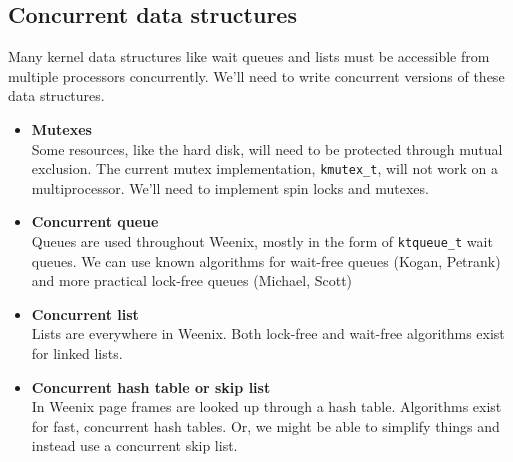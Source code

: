 \documentclass{article}
\begin{document}
\subsection{Concurrent data structures}

Many kernel data structures like wait queues and lists must be accessible from multiple
processors concurrently. We'll need to write concurrent versions of these data structures.

\begin{itemize}
    \item \textbf{Mutexes}\\
    Some resources, like the hard disk, will need to be protected through mutual exclusion. The current mutex
    implementation, {\tt{kmutex\_t}}, will not work on a multiprocessor. We'll need to implement
    spin locks and mutexes.
    \item \textbf{Concurrent queue}\\
    Queues are used throughout Weenix, mostly in the form of {\tt{ktqueue\_t}} wait queues. We can
    use known algorithms for wait-free queues (Kogan, Petrank) and more practical lock-free queues (Michael, Scott) 
    \item \textbf{Concurrent list}\\
    Lists are everywhere in Weenix. Both lock-free and wait-free algorithms exist for linked lists.
    \item \textbf{Concurrent hash table or skip list}\\
    In Weenix page frames are looked up through a hash table. Algorithms exist for fast, concurrent hash tables. Or,
    we might be able to simplify things and instead use a concurrent skip list.
\end{itemize}
\end{document}
